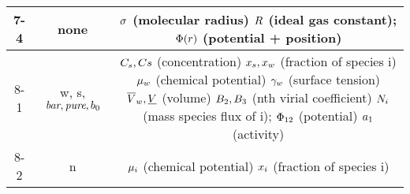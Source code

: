 \begin{tabular} { | c | c | c | }
    7-4 & none & \shortstack{$\molecrad$ (molecular radius) \\ $\gasconst$ (ideal gas constant); \\ $\pot(\pos)$ (potential + position)} \\  \hline
    8-1 & w, s,$\textit{bar},\textit{pure}, b_{\init}$ & \shortstack{$\conc_{s}, \conc s$ (concentration) \\ $\specfrac{s}, \specfrac{w}$ (fraction of species i) \\ $\chempot_{w}$ (chemical potential) \\ $\surftens_{w}$ (surface tension) \\ $\overline{\vol}_{w}, \uline{\vol}$ (volume) \\ $\virialcoeff{2}, \virialcoeff{3}$ (nth virial coefficient) \\ $\massspecflux{i}$ (mass species flux of i);\\ $\pot_{12}$ (potential)\\ $\activity_{1}$  (activity)}  \\ \hline
    8-2 & n & \shortstack{$\chempot_{i}$ (chemical potential) \\ $\specfrac{i}$ (fraction of species i)} \\ \hline
\end{tabular}



